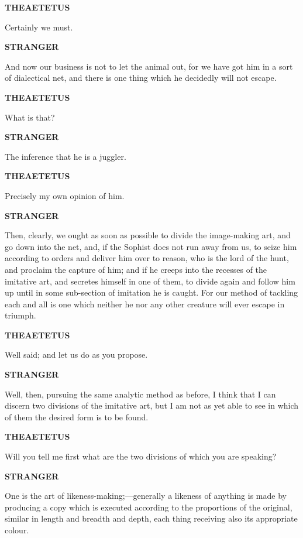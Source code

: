 \documentclass[11pt,letter]{article}
\begin{document}
\par \textbf{THEAETETUS}
\par   Certainly we must.

\par \textbf{STRANGER}
\par   And now our business is not to let the animal out, for we have got him in a sort of dialectical net, and there is one thing which he decidedly will not escape.

\par \textbf{THEAETETUS}
\par   What is that?

\par \textbf{STRANGER}
\par   The inference that he is a juggler.

\par \textbf{THEAETETUS}
\par   Precisely my own opinion of him.

\par \textbf{STRANGER}
\par   Then, clearly, we ought as soon as possible to divide the image-making art, and go down into the net, and, if the Sophist does not run away from us, to seize him according to orders and deliver him over to reason, who is the lord of the hunt, and proclaim the capture of him; and if he creeps into the recesses of the imitative art, and secretes himself in one of them, to divide again and follow him up until in some sub-section of imitation he is caught. For our method of tackling each and all is one which neither he nor any other creature will ever escape in triumph.

\par \textbf{THEAETETUS}
\par   Well said; and let us do as you propose.

\par \textbf{STRANGER}
\par   Well, then, pursuing the same analytic method as before, I think that I can discern two divisions of the imitative art, but I am not as yet able to see in which of them the desired form is to be found.

\par \textbf{THEAETETUS}
\par   Will you tell me first what are the two divisions of which you are speaking?

\par \textbf{STRANGER}
\par   One is the art of likeness-making;—generally a likeness of anything is made by producing a copy which is executed according to the proportions of the original, similar in length and breadth and depth, each thing receiving also its appropriate colour.
\end{document}
